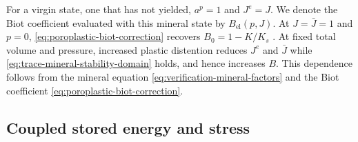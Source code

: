 For a virgin state, one that has not yielded, \(a^p=1\) and \(J^e=J\).  We
denote the Biot coefficient evaluated with this mineral state by
\(B_{\mathrm{el}}(p,J)\).
At \(J=\bar J=1\) and \(p=0\), \eqref{eq:poroplastic-biot-correction} recovers
\(B_0=1-K/K_s\) \citep{biotwillis1957}.  At fixed total volume and pressure,
increased plastic distention reduces \(J^e\) and \(\bar J\) while
\eqref{eq:trace-mineral-stability-domain} holds, and hence increases \(B\).  This dependence follows from the
mineral equation \eqref{eq:verification-mineral-factors} and the Biot
coefficient \eqref{eq:poroplastic-biot-correction}.

\subsection{Coupled stored energy and stress}

